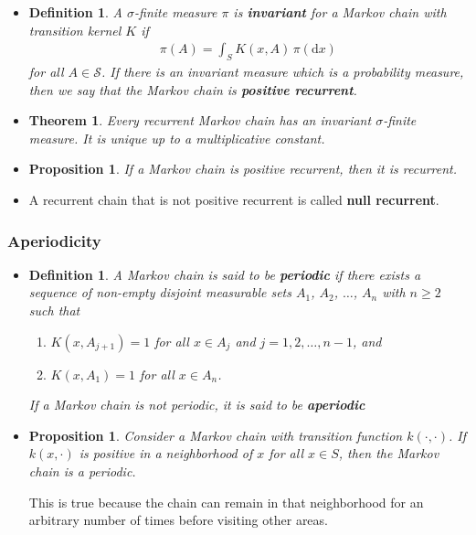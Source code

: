 \documentclass[10pt]{article}
\newtheorem{theorem}[lemma]{Theorem}
\newtheorem{definition}[lemma]{Definition}
\newtheorem{proposition}[lemma]{Proposition}
\newcommand{\dee}{\mathrm{d}}
\newcommand{\mcal}[1]{\mathcal{#1}}
\begin{document}
\begin{itemize}
  \item \begin{definition}
    A $\sigma$-finite measure $\pi$ is {\bf invariant} for a Markov chain with transition kernel $K$ if
    \begin{align*}
      \pi(A) = \int_S K(x,A)\, \pi(\dee x)
    \end{align*}
    for all $A \in \mcal{S}$. If there is an invariant measure which is a probability measure, then we say that the Markov chain is {\bf positive recurrent}.
  \end{definition}

  \item \begin{theorem}
    Every recurrent Markov chain has an invariant $\sigma$-finite measure. It is unique up to a multiplicative constant.
  \end{theorem}

  \item \begin{proposition}
    If a Markov chain is positive recurrent, then it is recurrent.
  \end{proposition}

  \item A recurrent chain that is not positive recurrent is called {\bf null recurrent}.
\end{itemize}
  
\subsubsection{Aperiodicity}

\begin{itemize}
  \item \begin{definition}
    A Markov chain is said to be {\bf periodic} if there exists a sequence of non-empty disjoint measurable sets $A_1$, $A_2$, $\dotsc$, $A_n$ with $n \geq 2$ such that
    \begin{enumerate}
      \item[(a)] $K(x, A_{j+1}) = 1$ for all $x \in A_j$ and $j = 1, 2, \dotsc, n-1$, and
      \item[(b)] $K(x, A_1) = 1$ for all $x \in A_n$.
    \end{enumerate}
    If a Markov chain is not periodic, it is said to be {\bf aperiodic}
  \end{definition}

  \item \begin{proposition}
    Consider a Markov chain with transition function $k(\cdot, \cdot)$. If $k(x, \cdot)$ is positive in a neighborhood of $x$ for all $x \in S$, then the Markov chain is a periodic.
  \end{proposition}

  This is true because the chain can remain in that neighborhood for an arbitrary number of times before visiting other areas.
\end{itemize}
\end{document}
